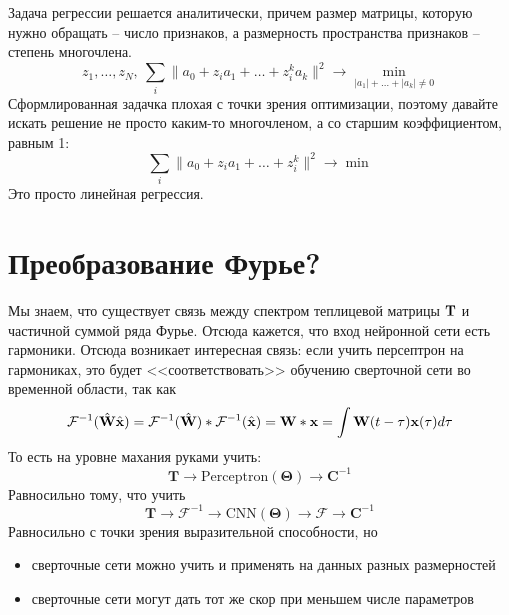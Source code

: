 \documentclass[a4paper, 12pt]{article}
\begin{document}
\begin{itemize}
\begin{itemize}
                Задача регрессии решается аналитически, причем 
                размер матрицы, которую нужно обращать -- число признаков,
                а размерность пространства признаков -- степень многочлена.
                \[
                    z_1,\dots,z_{N},\:
                    \sum_{i} \|a_0 + z_i a_1 + \dots + z_i^k a_k\|^2
                    \to\min_{|a_1|+\dots+|a_k|\ne 0}
                \]
                Сформлированная задачка плохая с точки зрения оптимизации,
                поэтому давайте искать решение не просто каким-то
                многочленом, а со старшим коэффициентом, равным 1:
                \[
                    \sum_{i} \|a_0 + z_i a_1 + \dots + z_i^k\|^2\to\min
                \]
                Это просто линейная регрессия.
        \end{itemize}
\end{itemize}

\section{Преобразование Фурье?}

Мы знаем, что существует связь между
спектром теплицевой матрицы $\textbf T$ и частичной суммой ряда Фурье.
Отсюда кажется, что вход нейронной сети есть 
гармоники. Отсюда
возникает интересная связь:
если учить персептрон на гармониках, это
будет <<соответствовать>> обучению сверточной сети во временной области, так
как
\[
    \mathcal F^{-1}(\hat{\textbf{W}}\hat{\textbf{x}})
    =
    \mathcal F^{-1}(\hat{\textbf{W}}) * \mathcal F^{-1}(\hat{\textbf{x}})
    =
    \textbf W * \textbf x
    =
    \int \textbf W(t-\tau)\textbf x(\tau) d\tau
\]
То есть на уровне махания руками учить:
\[
    \textbf{T}\to \mathrm{Perceptron}(\boldsymbol\Theta) \to \textbf{C}^{-1}
\]
Равносильно тому, что учить
\[
    \textbf{T}\to\mathcal F^{-1}\to\mathrm{CNN}(\boldsymbol \Theta) 
    \to\mathcal F\to \textbf{C}^{-1}
\]
Равносильно с точки зрения выразительной способности,
но 
\begin{itemize}
    \item сверточные сети можно учить и применять на данных
        разных размерностей
    \item сверточные сети могут дать тот же скор при меньшем числе параметров
\end{itemize}
\end{document}
